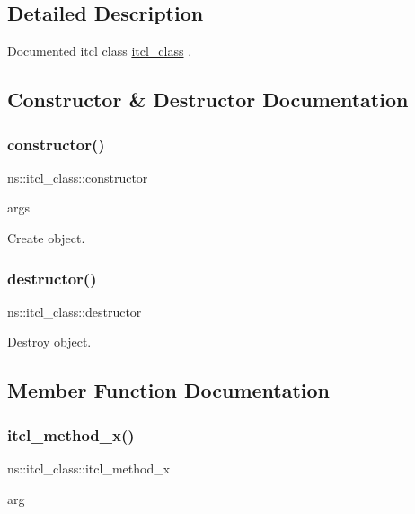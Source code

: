 \subsection{Detailed Description}
Documented itcl class {\ttfamily \mbox{\hyperlink{classns_1_1itcl__class}{itcl\+\_\+class}}} . 

\subsection{Constructor \& Destructor Documentation}
\mbox{\label{classns_1_1itcl__class_a8ba2ba9d7bcb63b99a765e8f6003134b}} 
\subsubsection{\texorpdfstring{constructor()}{constructor()}}
{\footnotesize\ttfamily ns\+::itcl\+\_\+class\+::constructor\begin{DoxyParamCaption}\item[{}]{args  }\end{DoxyParamCaption}}

Create object. \mbox{\label{classns_1_1itcl__class_ac72f3174993656391f9b54487aa4795e}} 
\subsubsection{\texorpdfstring{destructor()}{destructor()}}
{\footnotesize\ttfamily ns\+::itcl\+\_\+class\+::destructor}

Destroy object. 

\subsection{Member Function Documentation}
\mbox{\label{classns_1_1itcl__class_abc59160f823f3a6ec8c292c034aedbc3}} 
\subsubsection{\texorpdfstring{itcl\_method\_x()}{itcl\_method\_x()}}
{\footnotesize\ttfamily ns\+::itcl\+\_\+class\+::itcl\+\_\+method\+\_\+x\begin{DoxyParamCaption}\item[{}]{arg  }\end{DoxyParamCaption}}

